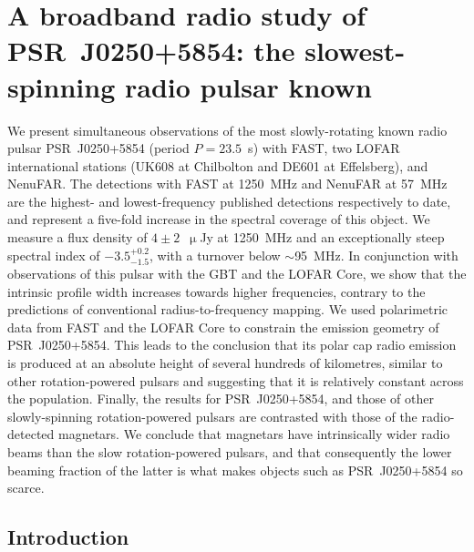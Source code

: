 \chapter[A broadband radio study of PSR~J0250+5854]{A broadband radio study of PSR~J0250+5854: the slowest-spinning radio pulsar known}
\label{chapt: J0250}


We present simultaneous observations of the most slowly-rotating known radio pulsar PSR~J0250+5854 (period $P=23.5$~s) with FAST, two LOFAR international stations (UK608 at Chilbolton and DE601 at Effelsberg), and NenuFAR. The detections with FAST at 1250~MHz and NenuFAR at 57~MHz are the highest- and lowest-frequency published detections respectively to date, and represent a five-fold increase in the spectral coverage of this object. We measure a flux density of $4\pm2$~$\upmu$Jy at 1250~MHz and an exceptionally steep spectral index of $-3.5^{+0.2}_{-1.5}$, with a turnover below $\sim$95~MHz. In conjunction with observations of this pulsar with the GBT and the LOFAR Core, we show that the intrinsic profile width increases towards higher frequencies, contrary to the predictions of conventional radius-to-frequency mapping. We used polarimetric data from FAST and the LOFAR Core to constrain the emission geometry of PSR~J0250+5854. This leads to the conclusion that its polar cap radio emission is produced at an absolute height of several hundreds of kilometres, similar to other rotation-powered pulsars and suggesting that it is relatively constant across the population. Finally, the results for PSR~J0250+5854, and those of other slowly-spinning rotation-powered pulsars are contrasted with those of the radio-detected magnetars. We conclude that magnetars have intrinsically wider radio beams than the slow rotation-powered pulsars, and that consequently the lower beaming fraction of the latter is what makes objects such as PSR~J0250+5854 so scarce.






\section{Introduction}
\label{sec: J0250 - introduction}


